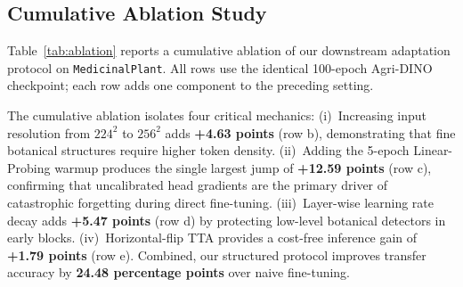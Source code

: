 \documentclass[10pt,twocolumn,letterpaper]{article}
\begin{document}
\subsection{Cumulative Ablation Study}
\label{sec:ablation}

Table~\ref{tab:ablation} reports a cumulative ablation of our downstream adaptation protocol on \texttt{MedicinalPlant}. All rows use the identical 100-epoch Agri-DINO checkpoint; each row adds one component to the preceding setting.

\begin{table}[t]
\centering
\caption{
  \textbf{Cumulative ablation of downstream adaptation on MedicinalPlant.}
  Each row adds one component to the preceding configuration; all rows use the shared Agri-DINO backbone.
}
\label{tab:ablation}
\setlength{\tabcolsep}{3pt}
\small
{}%
\end{table}

The cumulative ablation isolates four critical mechanics: (i)~Increasing input resolution from $224^2$ to $256^2$ adds \textbf{+4.63 points} (row b), demonstrating that fine botanical structures require higher token density. (ii)~Adding the 5-epoch Linear-Probing warmup produces the single largest jump of \textbf{+12.59 points} (row c), confirming that uncalibrated head gradients are the primary driver of catastrophic forgetting during direct fine-tuning. (iii)~Layer-wise learning rate decay adds \textbf{+5.47 points} (row d) by protecting low-level botanical detectors in early blocks. (iv)~Horizontal-flip TTA provides a cost-free inference gain of \textbf{+1.79 points} (row e). Combined, our structured protocol improves transfer accuracy by \textbf{24.48 percentage points} over naive fine-tuning.
\end{document}
